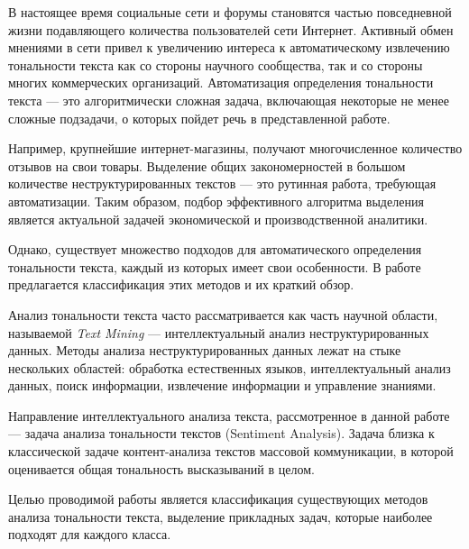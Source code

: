 \setcounter{page}{2}
В настоящее время социальные сети и форумы становятся частью повседневной жизни подавляющего количества пользователей сети Интернет. Активный обмен мнениями в сети привел к увеличению интереса к автоматическому извлечению тональности текста как со стороны научного сообщества, так и со стороны многих коммерческих организаций. Автоматизация определения тональности текста --- это алгоритмически сложная задача, включающая некоторые не менее сложные подзадачи, о которых пойдет речь в представленной работе.

Например, крупнейшие интернет-магазины, получают многочисленное количество отзывов на свои товары. Выделение общих закономерностей в большом количестве неструктурированных текстов --- это рутинная работа, требующая автоматизации. Таким образом, подбор эффективного алгоритма выделения является актуальной задачей экономической и производственной аналитики. 

Однако, существует множество подходов для автоматического определения тональности текста, каждый из которых имеет свои особенности. В работе предлагается классификация этих методов и их краткий обзор.

Анализ тональности текста часто рассматривается как часть научной области, называемой \textit{Text Mining} --- интеллектуальный анализ неструктурированных данных. Методы анализа неструктурированных данных лежат на стыке нескольких областей: обработка естественных языков, интеллектуальный анализ данных, поиск информации, извлечение информации и управление знаниями.\cite{data_mining}

Направление интеллектуального анализа текста, рассмотренное в данной работе --- задача анализа тональности текстов (Sentiment Analysis). Задача близка к классической задаче контент-анализа текстов массовой коммуникации, в которой оценивается общая тональность высказываний в целом. 

Целью проводимой работы является классификация существующих методов анализа тональности текста, выделение прикладных задач, которые наиболее подходят для каждого класса.